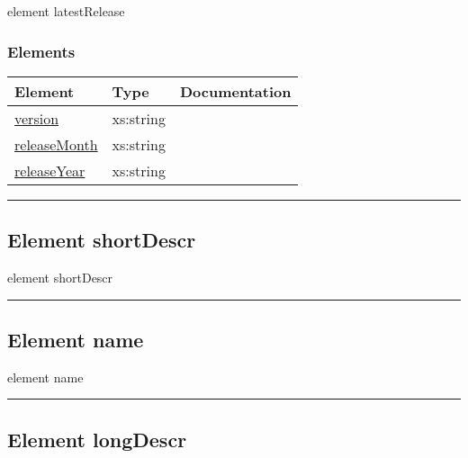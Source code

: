 \documentclass[
]{article}
\begin{document}
{element latestRelease}

\hypertarget{elements-4}{%
\subsubsection{Elements}\label{elements-4}}

\begin{longtable}[]{@{}lll@{}}
\toprule
Element & Type & Documentation \\
\midrule
\endhead
\protect\hyperlink{element_version}{version} & xs:string & \\
\protect\hyperlink{element_releaseMonth}{releaseMonth} & xs:string & \\
\protect\hyperlink{element_releaseYear}{releaseYear} & xs:string & \\
\bottomrule
\end{longtable}

\begin{center}\rule{0.5\linewidth}{0.5pt}\end{center}

\protect\hypertarget{element_shortDescr}{}{}

\hypertarget{element-shortdescr}{%
\subsection{\texorpdfstring{Element { shortDescr
}}{Element  shortDescr }}\label{element-shortdescr}}

{element shortDescr}

\begin{center}\rule{0.5\linewidth}{0.5pt}\end{center}

\protect\hypertarget{element_name}{}{}

\hypertarget{element-name}{%
\subsection{\texorpdfstring{Element { name
}}{Element  name }}\label{element-name}}

{element name}

\begin{center}\rule{0.5\linewidth}{0.5pt}\end{center}

\protect\hypertarget{element_longDescr}{}{}

\hypertarget{element-longdescr}{%
\subsection{\texorpdfstring{Element { longDescr
}}{Element  longDescr }}\label{element-longdescr}}
\end{document}
